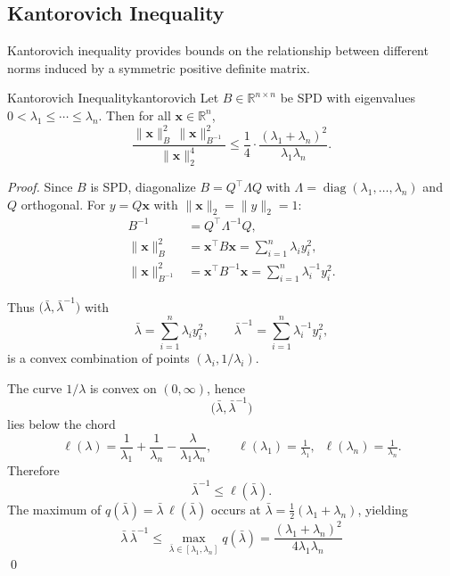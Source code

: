 \subsection{Kantorovich Inequality}
\label{subsec:kantorovich-inequality}
Kantorovich inequality provides bounds on the relationship between different norms induced by a symmetric positive definite matrix.
\begin{theorem}{Kantorovich Inequality}{kantorovich}
    Let $B \in \mathbb{R}^{n \times n}$ be SPD with eigenvalues $0 < \lambda_1 \leq \cdots \leq \lambda_n.$
    Then for all $\mathbf{x} \in \mathbb{R}^n$,
    \[
        \frac{\|\mathbf{x}\|_B^2 \,\|\mathbf{x}\|_{B^{-1}}^2}{\|\mathbf{x}\|_2^4}
        \leq \frac{1}{4}\cdot\frac{(\lambda_1 + \lambda_n)^2}{\lambda_1 \lambda_n}.
    \]
\end{theorem}
\begin{proof}
    Since $B$ is SPD, diagonalize $B = Q^{\top}\Lambda Q$ with $\Lambda = \operatorname{diag}(\lambda_1, \ldots, \lambda_n)$ and $Q$ orthogonal.
    For $y = Q\mathbf{x}$ with $\|\mathbf{x}\|_2 = \|y\|_2 = 1$:
    \begin{align*}
        B^{-1}                    & = Q^{\top} \Lambda^{-1} Q,                                                 \\
        \|\mathbf{x}\|_B^2        & = \mathbf{x}^{\top} B \mathbf{x} = \sum_{i=1}^n \lambda_i y_i^2,           \\
        \|\mathbf{x}\|_{B^{-1}}^2 & = \mathbf{x}^{\top} B^{-1} \mathbf{x} = \sum_{i=1}^n \lambda_i^{-1} y_i^2.
    \end{align*}

    Thus $\big(\bar\lambda, \bar\lambda^{-1}\big)$ with
    \[
        \bar\lambda = \sum_{i=1}^n \lambda_i y_i^2,
        \qquad
        \bar\lambda^{-1} = \sum_{i=1}^n \lambda_i^{-1} y_i^2,
    \]
    is a convex combination of points $(\lambda_i, 1/\lambda_i)$.

    The curve $1/\lambda$ is convex on $(0,\infty)$, hence
    \[
        \big(\bar\lambda, \bar\lambda^{-1}\big)
    \]
    lies below the chord
    \[
        \ell(\lambda) = \frac{1}{\lambda_1} + \frac{1}{\lambda_n} - \frac{\lambda}{\lambda_1 \lambda_n},
        \qquad \ell(\lambda_1) = \tfrac{1}{\lambda_1}, \;\; \ell(\lambda_n) = \tfrac{1}{\lambda_n}.
    \]
    Therefore
    \[
        \bar\lambda^{-1} \leq \ell(\bar\lambda).
    \]
    The maximum of $q(\bar\lambda) = \bar\lambda\,\ell(\bar\lambda)$ occurs at $\bar\lambda = \tfrac{1}{2}(\lambda_1 + \lambda_n)$, yielding
    \[
        \bar\lambda \,\bar\lambda^{-1} \leq \max_{\bar\lambda \in [\lambda_1, \lambda_n]} q(\bar\lambda) = \frac{(\lambda_1 + \lambda_n)^2}{4 \lambda_1 \lambda_n}
    \]\qed
\end{proof}

